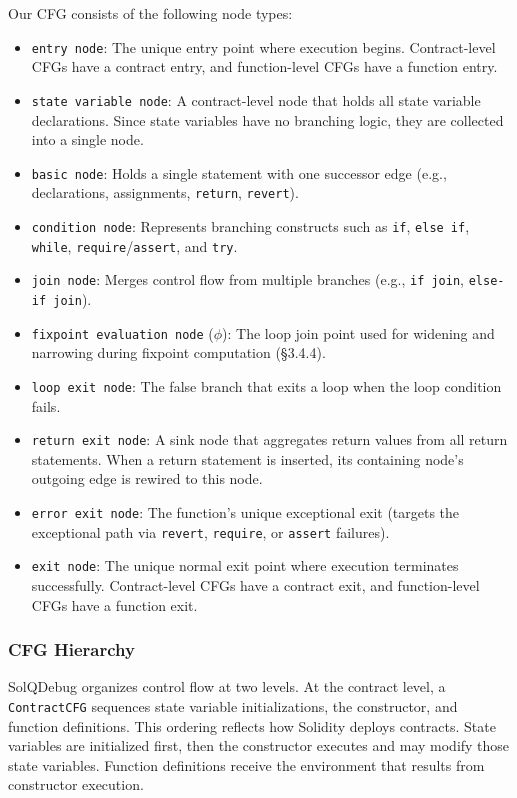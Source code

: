 \documentclass[pdflatex,sn-basic]{sn-jnl}%
\theoremstyle{thmstyleone}%
\theoremstyle{thmstyletwo}%
\theoremstyle{thmstylethree}%
\begin{document}
Our CFG consists of the following node types:
\begin{itemize}
  \item \texttt{entry node}: The unique entry point where execution begins. Contract-level CFGs have a contract entry, and function-level CFGs have a function entry.
  \item \texttt{state variable node}: A contract-level node that holds all state variable declarations. Since state variables have no branching logic, they are collected into a single node.
  \item \texttt{basic node}: Holds a single statement with one successor edge (e.g., declarations, assignments, \texttt{return}, \texttt{revert}).
  \item \texttt{condition node}: Represents branching constructs such as \texttt{if}, \texttt{else if}, \texttt{while}, \texttt{require}/\texttt{assert}, and \texttt{try}.
  \item \texttt{join node}: Merges control flow from multiple branches (e.g., \texttt{if join}, \texttt{else-if join}).
  \item \texttt{fixpoint evaluation node} (\(\phi\)): The loop join point used for widening and narrowing during fixpoint computation (\S3.4.4).
  \item \texttt{loop exit node}: The false branch that exits a loop when the loop condition fails.
  \item \texttt{return exit node}: A sink node that aggregates return values from all return statements. When a return statement is inserted, its containing node's outgoing edge is rewired to this node.
  \item \texttt{error exit node}: The function's unique exceptional exit (targets the exceptional path via \texttt{revert}, \texttt{require}, or \texttt{assert} failures).
  \item \texttt{exit node}: The unique normal exit point where execution terminates successfully. Contract-level CFGs have a contract exit, and function-level CFGs have a function exit.
\end{itemize}

\subsubsection{CFG Hierarchy}

SolQDebug organizes control flow at two levels.
At the contract level, a \texttt{ContractCFG} sequences state variable initializations, the constructor, and function definitions.
This ordering reflects how Solidity deploys contracts. State variables are initialized first, then the constructor executes and may modify those state variables.
Function definitions receive the environment that results from constructor execution.
\end{document}
